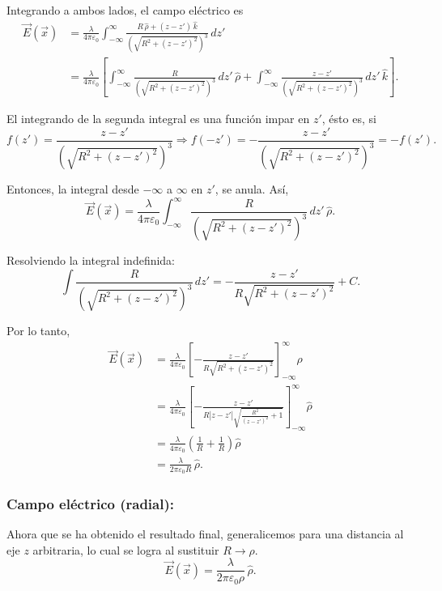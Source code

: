 \begin{ejemplo}
Integrando a ambos lados, el campo eléctrico es 
\begin{align*}
    \Vec{E}(\Vec{x}) &= \frac{\lambda}{4\pi \varepsilon_0} \int_{-\infty}^{\infty} \frac{R \,\hat{\rho} + (z-z')\, \hat{k}}{(\sqrt{R^2 + (z-z')^2})^3} \,dz' \\
    &= \frac{\lambda}{4\pi \varepsilon_0} \left[ \int_{-\infty}^{\infty} \frac{R}{(\sqrt{R^2 + (z-z')^2})^3} \,dz' \, \hat{\rho} + \int_{-\infty}^{\infty} \frac{z-z'}{(\sqrt{R^2 + (z-z')^2})^3} \,dz'\,\hat{k}\right].
\end{align*}

El integrando de la segunda integral es una función impar en $z'$, ésto es, si
$$f(z') = \frac{z-z'}{(\sqrt{R^2 + (z-z')^2})^3} \Rightarrow f(-z') = - \frac{z-z'}{(\sqrt{R^2 + (z-z')^2})^3} = -f(z').$$

Entonces,  la integral desde $-\infty$ a $\infty$ en $z'$, se anula. Así,
$$\Vec{E}(\Vec{x}) = \frac{\lambda}{4\pi \varepsilon_0}\int_{-\infty}^{\infty} \frac{R}{(\sqrt{R^2 + (z-z')^2})^3} \,dz' \, \hat{\rho} .$$


Resolviendo la integral indefinida:
$$\int \frac{R}{(\sqrt{R^2 + (z-z')^2})^3} \,dz' = - \frac{z-z'}{R\sqrt{R^2 + (z-z')^2}} + C .$$
 
Por lo tanto, 
\begin{align*}
    \vec{E}(\vec{x}) &= \frac{ \lambda}{4\pi \varepsilon_0} \left[ - \frac{z-z'}{R\sqrt{R^2 + (z-z')^2}} \right]_{-\infty}^{\infty} \hat{\rho} \\
&=  \frac{\lambda}{4\pi \varepsilon_0} \left[ - \frac{z-z'}{ R|z-z'|\sqrt{\frac{R^2}{(z-z')^2} + 1}} \right]_{-\infty}^{\infty} \hat{\rho} \\
&= \frac{\lambda}{4\pi \varepsilon_0} \left( \frac{1}{R} + \frac{1}{R} \right) \hat{\rho}  \\
&= \frac{\lambda}{2\pi \varepsilon_0 R} \,\hat{\rho}.
\end{align*}

\end{ejemplo}

\subsubsection{Campo eléctrico (radial):}

Ahora que se ha obtenido el resultado final, generalicemos para una distancia al eje $z$ arbitraria, lo cual se logra al sustituir $R \rightarrow \rho$.
$$\vec{E}(\Vec{x}) = \frac{\lambda}{2 \pi \varepsilon_0 \rho}\, \hat{\rho}.$$

